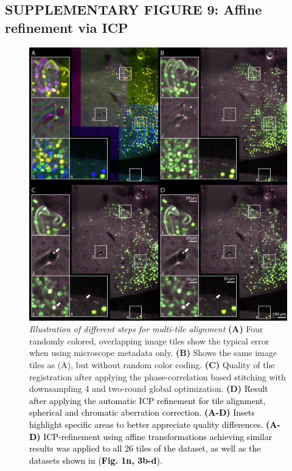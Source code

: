 \documentclass[]{spie}  %
\def\red{\textcolor{black}}
\begin{document}
\pagebreak

\subsection*{SUPPLEMENTARY FIGURE 9: Affine refinement via ICP}
\vspace{-3mm}
\begin{figure}[h!]
\includegraphics[width=\textwidth]{fig-stitching_icp.jpg}
\vspace{-3.0mm}
\caption{\hspace{-0.5mm} \emph{Illustration of different steps for multi-tile alignment} \textbf{(A)} Four randomly colored, overlapping image tiles show the typical error when using microscope metadata only. \textbf{(B)} Shows the same image tiles as (A), but without random color coding. \textbf{(C)} Quality of the registration after applying the phase-correlation based stitching with downsampling 4 and two-round global optimization. \textbf{(D)} \red{Result after applying the automatic ICP refinement for tile alignment, spherical and chromatic aberration correction. \textbf{(A-D)} Insets highlight specific areas to better appreciate quality differences. \textbf{(A-D)} ICP-refinement using affine transformations achieving similar results was applied to all 26 tiles of the dataset, as well as the datasets shown in (\textbf{Fig. 1n, 3b-d}). 
}}
\label{fig:sup-fig-icp}
\end{figure}
\end{document}
